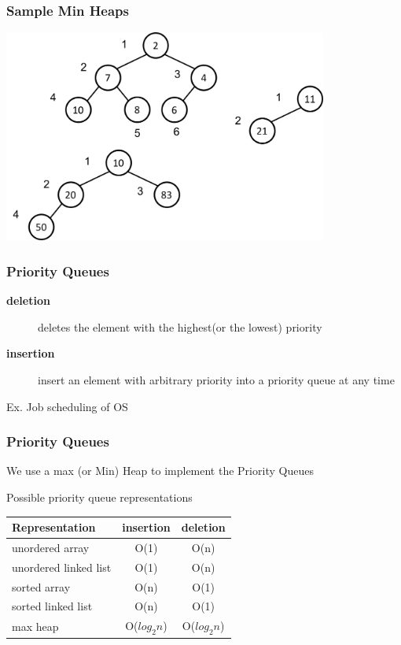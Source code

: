 \documentclass[newPxFont,sthlmFooter,nooffset]{beamer}
\begin{document}
\begin{frame}[t]
  \frametitle{Sample Min Heaps}
  \begin{center}
    \includegraphics[width=0.8\textwidth]{figures/fig12_sample_heap1.png}
  \end{center}

\end{frame}


\begin{frame}[t]
  \frametitle{Priority Queues}
  \begin{description}
  \item [\textbf{deletion}] deletes the element with the highest(or
    the lowest) priority
  \item [\textbf{insertion}] insert an element with arbitrary priority
    into a priority queue at any time
  \end{description}
Ex. Job scheduling of OS
\end{frame}


\begin{frame}[t]
  \frametitle{Priority Queues}
We use a max (or Min) Heap to implement the Priority Queues

Possible priority queue representations

\begin{tabular}{l c c}
  Representation & insertion & deletion \\ \hline \hline
unordered array & O(1) & O(n) \\
unordered linked list & O(1) & O(n) \\
sorted array & O(n) & O(1) \\
sorted linked list & O(n) & O(1) \\
max heap & O($log_2n$) &  O($log_2n$) \\
\end{tabular}
\end{frame}
\end{document}
